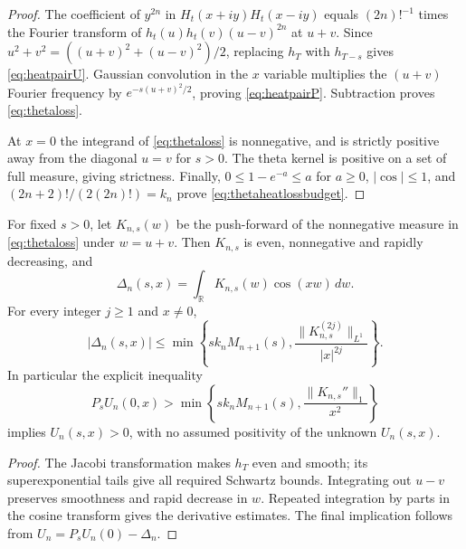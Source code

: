 \begin{proof}
The coefficient of $y^{2n}$ in
$H_t(x+iy)H_t(x-iy)$ equals
$(2n)!^{-1}$ times the Fourier transform
of $h_t(u)h_t(v)(u-v)^{2n}$ at $u+v$.
Since $u^2+v^2=((u+v)^2+(u-v)^2)/2$,
replacing $h_T$ with $h_{T-s}$ gives
\eqref{eq:heatpairU}. Gaussian convolution
in the $x$ variable multiplies the
$(u+v)$ Fourier frequency by
$e^{-s(u+v)^2/2}$, proving
\eqref{eq:heatpairP}. Subtraction proves
\eqref{eq:thetaloss}.

At $x=0$ the integrand of
\eqref{eq:thetaloss} is nonnegative,
and is strictly positive away from the
diagonal $u=v$ for $s>0$.
The theta kernel is positive on a
set of full measure, giving strictness.
Finally, $0\le1-e^{-a}\le a$ for $a\ge0$,
$|\cos|\le1$, and
$(2n+2)!/(2(2n)!)=k_n$ prove
\eqref{eq:thetaheatlossbudget}.
\end{proof}

\begin{corollary}\label{cor:spectrallossdecay}
For fixed $s>0$, let $K_{n,s}(w)$ be the
push-forward of the nonnegative measure
in \eqref{eq:thetaloss} under $w=u+v$.
Then $K_{n,s}$ is even, nonnegative
and rapidly decreasing, and
\[
\Delta_n(s,x)=\int_{\mathbb R}K_{n,s}(w)
                      \cos(xw)\,dw.
\]
For every integer $j\ge1$ and $x\ne0$,
\begin{equation}
|\Delta_n(s,x)|\le
\min\left\{
s k_nM_{n+1}(s),
\frac{\|K_{n,s}^{(2j)}\|_{L^1}}{|x|^{2j}}
\right\}.
\label{eq:lossderivatives}
\end{equation}
In particular the explicit inequality
\begin{equation}
P_sU_n(0,x)>
\min\left\{s k_nM_{n+1}(s),
\frac{\|K_{n,s}''\|_1}{x^2}\right\}
\label{eq:noncircularband}
\end{equation}
implies $U_n(s,x)>0$, with no assumed
positivity of the unknown $U_n(s,x)$.
\end{corollary}
\begin{proof}
The Jacobi transformation makes $h_T$
even and smooth; its superexponential
tails give all required Schwartz bounds.
Integrating out $u-v$ preserves smoothness
and rapid decrease in $w$.
Repeated integration by parts in the
cosine transform gives the derivative
estimates. The final implication follows
from $U_n=P_sU_n(0)-\Delta_n$.
\end{proof}

